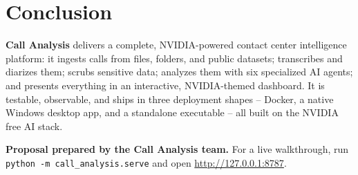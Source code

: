 \documentclass[11pt,a4paper]{article}
\begin{document}
\section{Conclusion}

\textbf{Call Analysis} delivers a complete, NVIDIA-powered contact center intelligence
platform: it ingests calls from files, folders, and public datasets; transcribes and
diarizes them; scrubs sensitive data; analyzes them with six specialized AI agents; and
presents everything in an interactive, NVIDIA-themed dashboard. It is testable,
observable, and ships in three deployment shapes -- Docker, a native Windows desktop app,
and a standalone executable -- all built on the NVIDIA free AI stack.

\begin{note}
\textbf{Proposal prepared by the Call Analysis team.} For a live walkthrough, run
\texttt{python -m call\_analysis.serve} and open \url{http://127.0.0.1:8787}.
\end{note}
\end{document}
